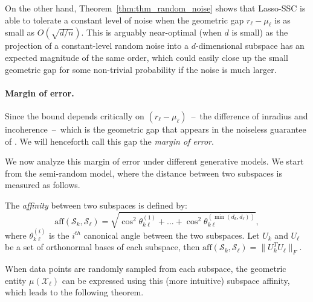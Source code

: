 \documentclass[twoside,11pt]{article}
\numberwithin{equation}{section}
\begin{document}
On the other hand, Theorem~\ref{thm:thm_random_noise} shows that Lasso-SSC is able to tolerate a constant level of noise when the geometric gap $r_\ell-\mu_\ell$ is as small as $O(\sqrt{d/n})$. This is arguably near-optimal (when $d$ is small) as the projection of a constant-level random noise into a $d$-dimensional subspace has an expected magnitude of the same order, which could easily close up the small geometric gap for some non-trivial probability if the noise is much larger.



\paragraph{Margin of error.}
Since the bound depends critically on $(r_\ell-\mu_\ell)$~--~the difference of inradius and incoherence~--~which is the geometric gap that appears in the noiseless guarantee of \citet{soltanolkotabi2011geometric}. We will henceforth call this gap the \emph{margin of error}.

We now analyze this margin of error under different generative models. We
start from the semi-random model, where the distance between two subspaces is measured as follows.
\begin{definition}\label{def:subspace_affinity}
The {\em affinity} between two subspaces is defined by:
$$ \mathrm{aff}(\mathcal{S}_k,\mathcal{S}_{\ell}) = \sqrt{\cos^2{\theta^{(1)}_{k\ell }}+...+\cos^2{\theta^{(\min(d_k,d_{\ell}))}_{k\ell}}},$$
where $\theta_{k\ell}^{(i)}$ is the $i^{th}$ canonical angle between the two subspaces. Let $U_{k}$ and $U_{\ell}$ be a set of orthonormal bases of each subspace, then $\mathrm{aff}(\mathcal{S}_k,\mathcal{S}_{\ell})=\|U_{k}^TU_{\ell}\|_F$.
\end{definition}
When data points are randomly sampled from each subspace, the geometric entity $\mu(\mathcal{X}_{\ell})$ can be expressed using this (more intuitive) subspace affinity, which leads to the following theorem.
\end{document}
